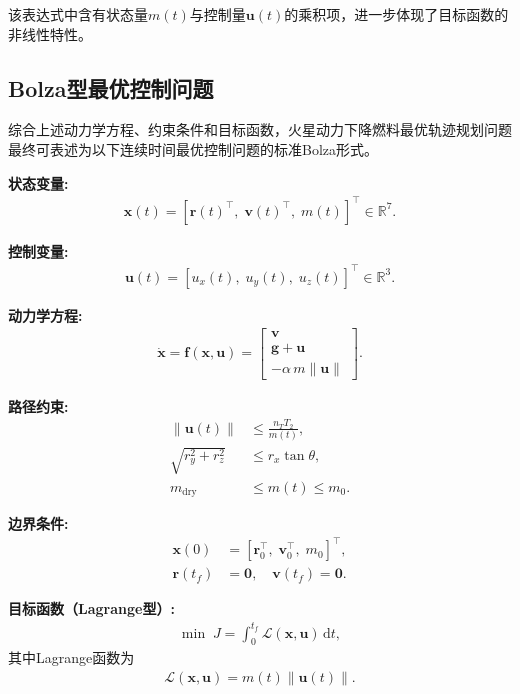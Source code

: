 该表达式中含有状态量$m(t)$与控制量$\bm{u}(t)$的乘积项，进一步体现了目标函数的非线性特性。

\subsection{Bolza型最优控制问题}

综合上述动力学方程、约束条件和目标函数，火星动力下降燃料最优轨迹规划问题最终可表述为以下连续时间最优控制问题的标准Bolza形式。

\textbf{状态变量:}
\begin{align}
    \bm{x}(t) = [\bm{r}(t)^{\top},\; \bm{v}(t)^{\top},\; m(t)]^{\top} \in \mathbb{R}^7.
\end{align}

\textbf{控制变量:}
\begin{align}
    \bm{u}(t) = [u_x(t),\; u_y(t),\; u_z(t)]^{\top} \in \mathbb{R}^3.
\end{align}

\textbf{动力学方程:}
\begin{align}
    \dot{\bm{x}} = \bm{f}(\bm{x}, \bm{u}) =
    \begin{bmatrix}
        \bm{v} \\
        \bm{g} + \bm{u} \\
        -\alpha\,m\|\bm{u}\|
    \end{bmatrix}. \label{eq:bolza_dyn}
\end{align}

\textbf{路径约束:}
\begin{align}
    \left\|\bm{u}(t)\right\| &\leq \frac{n_T T_2}{m(t)}, \label{eq:bolza_path1} \\
    \sqrt{r_y^2 + r_z^2}    &\leq r_x \tan\theta, \label{eq:bolza_path2} \\
    m_{\mathrm{dry}}        &\leq m(t) \leq m_0. \label{eq:bolza_path3}
\end{align}

\textbf{边界条件:}
\begin{align}
    \bm{x}(0) &= [\bm{r}_0^{\top},\; \bm{v}_0^{\top},\; m_0]^{\top}, \label{eq:bolza_bc1} \\
    \bm{r}(t_f) &= \bm{0},\quad \bm{v}(t_f) = \bm{0}. \label{eq:bolza_bc2}
\end{align}

\textbf{目标函数（Lagrange型）:}
\begin{align}
    \min\; J = \int_0^{t_f} \mathcal{L}(\bm{x}, \bm{u})\,\mathrm{d}t, \label{eq:bolza_cost}
\end{align}
其中Lagrange函数为
\begin{align}
    \mathcal{L}(\bm{x}, \bm{u}) = m(t)\left\|\bm{u}(t)\right\|. \label{eq:lagrangian}
\end{align}

